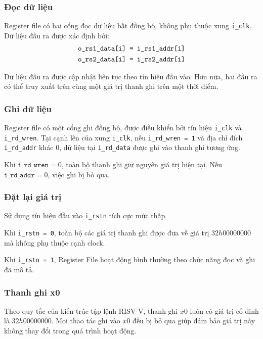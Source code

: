 \subsubsection{Đọc dữ liệu}
\label{subsubsec:m1-reg_file_read}
Register file có hai cổng đọc dữ liệu bất đồng bộ, không phụ thuộc xung \texttt{i\_clk}.
Dữ liệu đầu ra được xác định bởi: 
\begin{gather*}
    \texttt{o\_rs1\_data[i] = \texttt{i\_rs1\_addr[i]}}\\
    \texttt{o\_rs2\_data[i] = \texttt{i\_rs2\_addr[i]}}
\end{gather*}

Dữ liệu đầu ra được cập nhật liên tục theo tín hiệu đầu vào. Hơn nữa, hai đầu ra có thể truy xuất trên cùng một giá trị thanh ghi trên một thời điểm.
\subsubsection{Ghi dữ liệu}
\label{subsubsec:m1-reg_file_write}
Register file có một cổng ghi đồng bộ, được điều khiển bởi tín hiệu \texttt{i\_clk} và \texttt{i\_rd\_wren}.
Tại cạnh lên của xung \texttt{i\_clk}, nếu \texttt{i\_rd\_wren = 1} và địa chỉ đích \texttt{i\_rd\_addr} khác 0, dữ liệu tại \texttt{i\_rd\_data} được ghi vào thanh ghi tương ứng.

Khi $\texttt{i\_rd\_wren} = 0$, toàn bộ thanh ghi giữ nguyên giá trị hiện tại. Nếu $\texttt{i\_rd\_addr} = 0$, việc ghi bị bỏ qua.

\subsubsection{Đặt lại giá trị}
\label{subsubsec:m1-reg_file_reset}
Sử dụng tín hiệu đầu vào \texttt{i\_rstn} tích cực mức thấp.

Khi \texttt{i\_rstn = 0}, toàn bộ các giá trị thanh ghi được đưa về giá trị $32h00000000$ mà không phụ thuộc cạnh clock.

Khi \texttt{i\_rstn = 1}, Register File hoạt động bình thường theo chức năng đọc và ghi đã mô tả.

\subsubsection{Thanh ghi x0}
\label{subsubsec:m1-reg_file_x0}
Theo quy tắc của kiến trúc tập lệnh RISV-V, thanh ghi $x0$ luôn có giá trị cố định là $32h00000000$. 
Mọi thao tác ghi vào $x0$ đều bị bỏ qua giúp đảm bảo giá trị này không thay đổi trong quá trình hoạt động.

